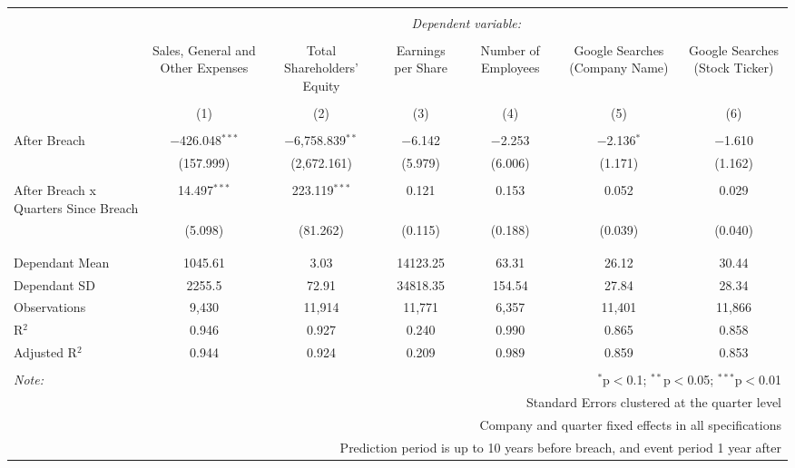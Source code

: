 
\begin{table}[!htbp] \centering 
  \caption{} 
  \label{} 
\begin{tabular}{@{\extracolsep{5pt}}lcccccc} 
\\[-1.8ex]\hline 
\hline \\[-1.8ex] 
 & \multicolumn{6}{c}{\textit{Dependent variable:}} \\ 
\cline{2-7} 
\\[-1.8ex] & Sales, General and Other Expenses & Total Shareholders' Equity & Earnings per Share {Basic) & Number of Employees & Google Searches (Company Name) & Google Searches (Stock Ticker) \\ 
\\[-1.8ex] & (1) & (2) & (3) & (4) & (5) & (6)\\ 
\hline \\[-1.8ex] 
 After Breach & $-$426.048$^{***}$ & $-$6,758.839$^{**}$ & $-$6.142 & $-$2.253 & $-$2.136$^{*}$ & $-$1.610 \\ 
  & (157.999) & (2,672.161) & (5.979) & (6.006) & (1.171) & (1.162) \\ 
  & & & & & & \\ 
 After Breach x Quarters Since Breach & 14.497$^{***}$ & 223.119$^{***}$ & 0.121 & 0.153 & 0.052 & 0.029 \\ 
  & (5.098) & (81.262) & (0.115) & (0.188) & (0.039) & (0.040) \\ 
  & & & & & & \\ 
\hline \\[-1.8ex] 
Dependant Mean & 1045.61 & 3.03 & 14123.25 & 63.31 & 26.12 & 30.44 \\ 
Dependant SD & 2255.5 & 72.91 & 34818.35 & 154.54 & 27.84 & 28.34 \\ 
Observations & 9,430 & 11,914 & 11,771 & 6,357 & 11,401 & 11,866 \\ 
R$^{2}$ & 0.946 & 0.927 & 0.240 & 0.990 & 0.865 & 0.858 \\ 
Adjusted R$^{2}$ & 0.944 & 0.924 & 0.209 & 0.989 & 0.859 & 0.853 \\ 
\hline 
\hline \\[-1.8ex] 
\textit{Note:}  & \multicolumn{6}{r}{$^{*}$p$<$0.1; $^{**}$p$<$0.05; $^{***}$p$<$0.01} \\ 
 & \multicolumn{6}{r}{Standard Errors clustered at the quarter level} \\ 
 & \multicolumn{6}{r}{Company and quarter fixed effects in all specifications} \\ 
 & \multicolumn{6}{r}{Prediction period is up to 10 years before breach, and event period 1 year after} \\ 
\end{tabular} 
\end{table} 
